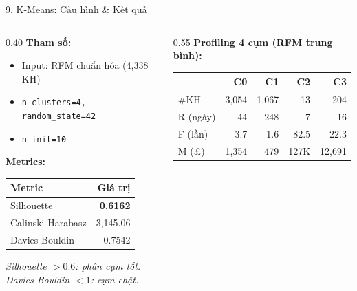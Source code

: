 \documentclass[10pt, aspectratio=169]{beamer}
\begin{document}
\begin{frame}{9. K-Means: Cấu hình \& Kết quả}
    \small
    \begin{columns}[T]
        \begin{column}{0.40\textwidth}
            \textbf{Tham số:}
            \begin{itemize}
                \item Input: RFM chuẩn hóa (4,338 KH)
                \item \texttt{n\_clusters=4, random\_state=42}
                \item \texttt{n\_init=10}
            \end{itemize}
            
            \vspace{0.15cm}
            \textbf{Metrics:}
            
            \begin{tabularx}{\linewidth}{Xr}
                \toprule
                \textbf{Metric} & \textbf{Giá trị} \\
                \midrule
                Silhouette & \textbf{0.6162} \\
                Calinski-Harabasz & 3,145.06 \\
                Davies-Bouldin & 0.7542 \\
                \bottomrule
            \end{tabularx}
            
            \vspace{0.1cm}
            \footnotesize
            \textit{Silhouette $> 0.6$: phân cụm tốt.}\\
            \textit{Davies-Bouldin $< 1$: cụm chặt.}
        \end{column}
        
        \begin{column}{0.55\textwidth}
            \textbf{Profiling 4 cụm (RFM trung bình):}
            
            \footnotesize
            \begin{tabularx}{\linewidth}{X r r r r}
                \toprule
                & \textbf{C0} & \textbf{C1} & \textbf{C2} & \textbf{C3} \\
                \midrule
                \#KH & 3,054 & 1,067 & 13 & 204 \\
                R (ngày) & 44 & 248 & 7 & 16 \\
                F (lần) & 3.7 & 1.6 & 82.5 & 22.3 \\
                M (£) & 1,354 & 479 & 127K & 12,691 \\
                \bottomrule
            \end{tabularx}
            

\end{column}
\end{columns}
\end{frame}
\end{document}
